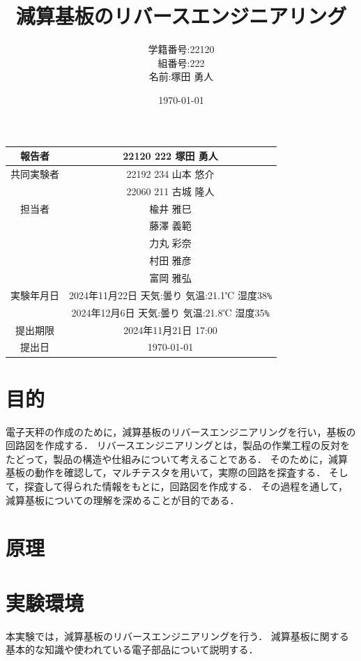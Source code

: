 \documentclass[a4paper,11pt,dvipdfmx]{jsarticle}
\begin{document}
\begin{table}[b]
  \centering
  \begin{tabular}{|c|c|}
    \hline
    報告者     & 22120 222 塚田 勇人 \\
    \hline
    共同実験者 & 22192 234 山本 悠介  \\ & 22060 211 古城 隆人\\
    \hline
    担当者     & 楡井 雅巳 \\
              &  藤澤 義範\\
    &力丸 彩奈\\
    &村田 雅彦\\
    &富岡 雅弘\\
    \hline
    実験年月日 & 2024年11月22日 天気:曇り 気温:21.1℃ 湿度38\verb#%#\\
    & 2024年12月6日 天気:曇り 気温:21.8℃ 湿度35\verb#%#\\
    \hline
    提出期限   & 2024年11月21日 17:00  \\
    \hline
    提出日     & \today              \\
    \hline
  \end{tabular}
\end{table}

\title{減算基板のリバースエンジニアリング}
\author{学籍番号:22120 \\ 組番号:222 \\名前:塚田 勇人}
\date{\today}
\maketitle

\newpage

\section{目的}
電子天秤の作成のために，減算基板のリバースエンジニアリングを行い，基板の回路図を作成する．
リバースエンジニアリングとは，製品の作業工程の反対をたどって，製品の構造や仕組みについて考えることである．
そのために，減算基板の動作を確認して，マルチテスタを用いて，実際の回路を探査する．
そして，探査して得られた情報をもとに，回路図を作成する．
その過程を通して，減算基板についての理解を深めることが目的である．

\section{原理}

\section{実験環境}
本実験では，減算基板のリバースエンジニアリングを行う．
減算基板に関する基本的な知識や使われている電子部品について説明する．
\end{document}
